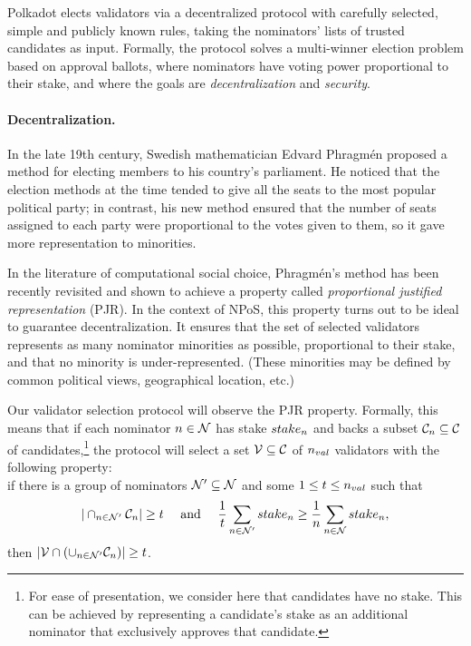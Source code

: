 Polkadot elects validators via a decentralized protocol with carefully selected, simple and publicly known rules,
taking the nominators' lists of trusted candidates as input. Formally, the protocol solves a multi-winner election
problem based on approval ballots, where nominators have voting power proportional to their stake,
and where the goals are \emph{decentralization} and \emph{security}.

\paragraph{Decentralization.} In the late 19th century, Swedish mathematician Edvard Phragm\'{e}n
proposed a method for electing members to his country’s parliament.
He noticed that the election methods at the time tended to give all the seats
to the most popular political party; in contrast, his new method ensured that the number of seats
assigned to each party were proportional to the votes given to them, so it gave more representation to minorities.

In the literature of computational social choice, Phragm\'{e}n's method has been recently revisited
and shown to achieve a property called \emph{proportional justified representation} (PJR).
In the context of NPoS, this property turns out to be ideal to guarantee decentralization.
It ensures that the set of selected validators represents as many nominator minorities as possible,
proportional to their stake, and that no minority is under-represented.
(These minorities may be defined by common political views, geographical location, etc.)

Our validator selection protocol will observe the PJR property.
Formally, this means that if each nominator $n \in \mathcal{N}$ has stake $stake_{n}$ and backs a subset
$\mathcal{C}_{n}\subseteq \mathcal{C}$ of candidates,\footnote{For ease of presentation, we consider here
that candidates have no stake. This can be achieved by representing a candidate's stake
as an additional nominator that exclusively approves that candidate.}
the protocol will select a set $\mathcal{V}\subseteq \mathcal{C}$ of $n_{val}$ validators with the following property: \\
if there is a group of nominators $\mathcal{N}'\subseteq \mathcal{N}$ and some $1\leq t\leq n_{val}$ such that
$$|\cap_{n\in \mathcal{N}'} \mathcal{C}_n| \geq t \quad \text{ and } \quad
\frac{1}{t} \sum_{n\in \mathcal{N}'} stake_{n} \geq \frac{1}{n} \sum_{n\in \mathcal{N}} stake_{n},$$
then $|\mathcal{V}\cap (\cup_{n\in\mathcal{N}'} \mathcal{C}_n)| \geq t$.

